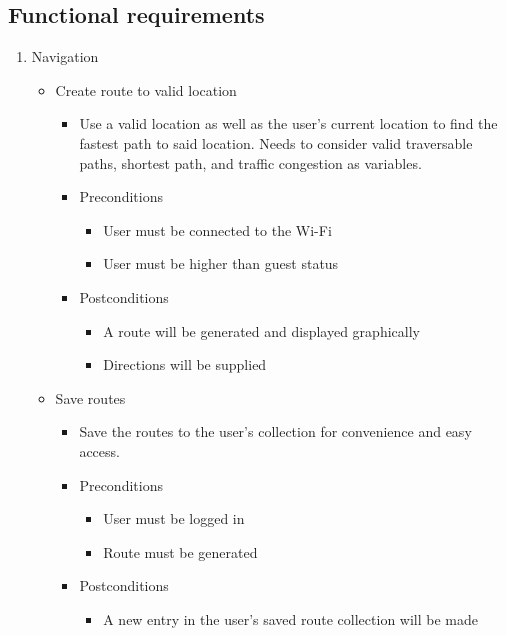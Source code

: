\documentclass[12pt]{article}
\begin{document}
	\subsection{Functional requirements}
		\begin{enumerate}
		  	\item Navigation	
		  	
			\begin{itemize}
			
				\item Create route to valid location
				\begin{itemize}
					\item Use a valid location as well as the user’s current location to find the fastest path to said location. Needs to consider valid traversable paths, shortest path, and traffic congestion as variables.
					\item Preconditions
					\begin{itemize}
						\item User must be connected to the Wi-Fi
						\item User must be higher than guest status
					\end{itemize}
					\item Postconditions
					\begin{itemize}
						\item A route will be generated and displayed graphically 
						\item Directions will be supplied
					\end{itemize}
				\end{itemize}
				
				\item Save routes
				\begin{itemize}
					\item Save the routes to the user’s collection for convenience and easy access.
					\item Preconditions
					\begin{itemize}
						\item User must be logged in
						\item Route must be generated
					\end{itemize}
					\item Postconditions
					\begin{itemize}
						\item A new entry in the user’s saved route collection will be made
					\end{itemize}
				\end{itemize}
				

\end{itemize}
\end{enumerate}
\end{document}
